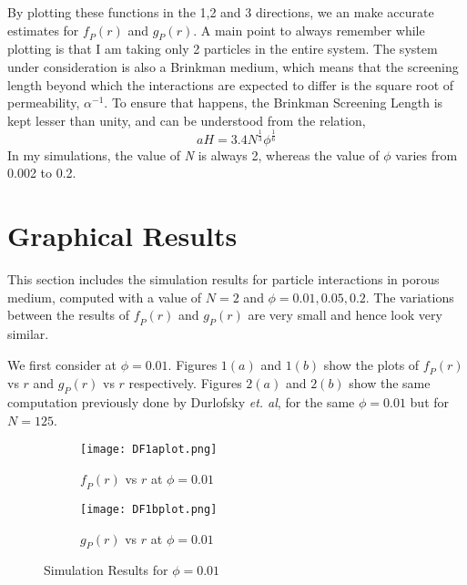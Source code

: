 \documentclass[12pt]{article}
\begin{document}
By plotting these functions in the 1,2 and 3 directions, we an make accurate estimates for $\textit{f}_P(r)$ and $\textit{g}_{P}(r)$. A main point to always remember while plotting is that I am taking only 2 particles in the entire system. The system under consideration is also a Brinkman medium, which means that the screening length beyond which the interactions are expected to differ is the square root of permeability, $\alpha^{-1}$. To ensure that happens, the Brinkman Screening Length is kept lesser than unity, and can be understood from the relation, 
\begin{equation}
aH=3.4N^{\frac{1}{3}}\phi^{\frac{1}{6}}
\end{equation}
In my simulations, the value of \textit{N} is always 2, whereas the value of $\phi$ varies from 0.002 to 0.2.

\section{Graphical Results}
\label{graphs}

This section includes the simulation results for particle interactions in porous medium, computed with a value of $N=2$ and $\phi=0.01, 0.05, 0.2$. The variations between the results of $\textit{f}_P(r)$ and $\textit{g}_{P}(r)$ are very small and hence look very similar. 


We first consider at $\phi=0.01$. Figures $1(a)$ and $1(b)$ show the plots of $\textit{f}_P(r)$ vs $r$ and $\textit{g}_{P}(r)$ vs $r$ respectively. Figures $2(a)$ and $2(b)$ show the same computation previously done by Durlofsky \textit{et. al}, for the same $\phi=0.01$ but for $N=125$.


\begin{figure}[ht]
\begin{subfigure}{.5\textwidth}
  \centering
  \texttt{[image: DF1aplot.png]}  
  \caption{$\textit{f}_P(r)$ vs $r$ at $\phi=0.01$}
\end{subfigure}
\begin{subfigure}{.5\textwidth}
  \centering
  \texttt{[image: DF1bplot.png]}  
  \caption{$\textit{g}_P(r)$ vs $r$ at $\phi=0.01$}
  \label{fig:sub-second}
\end{subfigure}
\caption{Simulation Results for $\phi=0.01$}
\label{fig:fig}
\end{figure}

\end{document}
